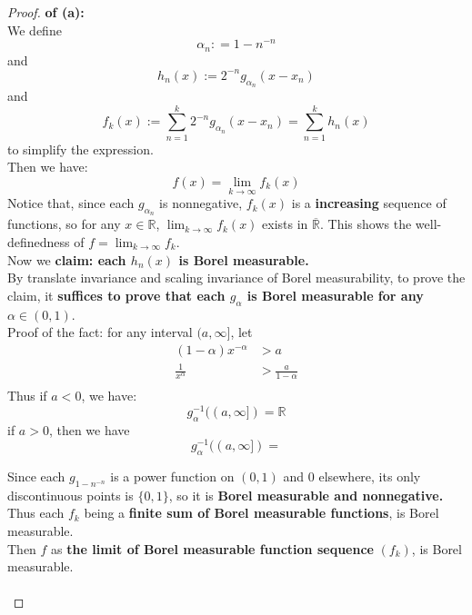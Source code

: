 \documentclass[lang=cn,11pt]{elegantbook}
\begin{document}
\begin{proof}
    \textbf{ of (a):}\\
  We define \[ \alpha_n : = 1 - n^{-n}
  \] and \[
    h_n(x) :=  2^{-n}g_{\alpha_n}(x - x_n)
    \] and \[
    f_k(x) := \sum_{n=1}^k 2^{-n}g_{\alpha_n}(x-x_n) = \sum_{n=1}^k  h_n(x)
    \] to simplify the expression.\\
Then we have: \[
f(x) = \lim_{k \rightarrow \infty} f_k(x)
\]
 Notice that, since each $g_{\alpha_n}$ is nonnegative, $f_k(x)$ is a \textbf{increasing} sequence of functions, so for any $x \in \mathbb{R}$, $ \lim_{k\to \infty} f_k(x)$ exists in $\overline{\mathbb{R}}$. This shows the well-definedness of $f  = \lim_{k\to \infty} f_k$. \\
Now we \textbf{claim: each $h_n(x)$ is Borel measurable.}\\
By translate invariance and scaling invariance of Borel measurability, to prove the claim, it \textbf{suffices to prove that each $g_{\alpha}$ is Borel measurable for any $\alpha \in (0,1)$}.\\
Proof of the fact: for any interval $(a,\infty]$, let 
\begin{align}
(1-\alpha) x^{-\alpha} & > a \\    
\frac{1}{x^\alpha} &> \frac{a}{1-\alpha} \\
\end{align}
Thus if $a < 0$, we have:  \[
g_\alpha^{-1}((a,\infty]) =  \mathbb{R}
\]
if $a > 0$, then we have \[
g_\alpha^{-1}((a,\infty]) = 
\]

    Since each $g_{1-n^{-n}}$ is a power function on $(0,1)$ and $0$ elsewhere, its only discontinuous points is $\{0,1\}$, so it is \textbf{Borel measurable and nonnegative.} \\

    Thus each $f_k$ being a \textbf{finite sum of Borel measurable functions}, is Borel measurable.\\
    
    Then $f $ as \textbf{the limit of Borel measurable function sequence} $(f_k)$, is Borel measurable.\\\\
\end{proof}
\end{document}
